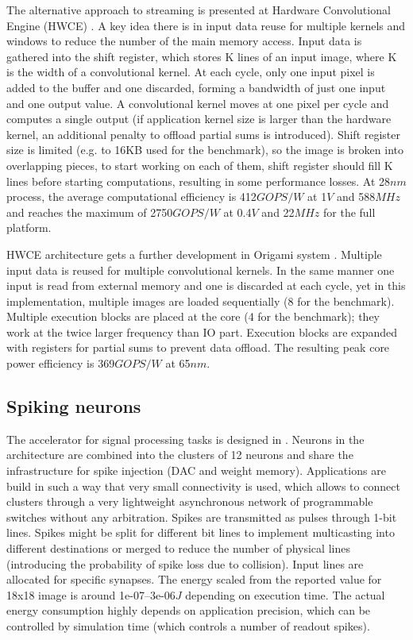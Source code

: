 \documentclass[conference, compsoc]{IEEEtran}
\begin{document}
The alternative approach to streaming is presented at Hardware Convolutional Engine (HWCE) \cite{HWCE}. A key idea there is in input data reuse for multiple kernels and windows to reduce the number of the main memory access. Input data is gathered into the shift register, which stores K lines of an input image, where K is the width of a convolutional kernel. At each cycle, only one input pixel is added to the buffer and one discarded, forming a bandwidth of just one input and one output value. A convolutional kernel moves at one pixel per cycle and computes a single output (if application kernel size is larger than the hardware kernel, an additional penalty to offload partial sums is introduced). Shift register size is limited (e.g. to 16KB used for the benchmark), so the image is broken into overlapping pieces, to start working on each of them, shift register should fill K lines before starting computations, resulting in some performance losses. At 28$ nm $ process, the average computational efficiency is 412$ GOPS/W $ at  1$ V $ and 588$ MHz $ and reaches the maximum of 2750$ GOPS/W $ at 0.4$ V $ and 22$ MHz $ for the full platform.

HWCE architecture gets a further development in Origami system \cite{Origami}. Multiple input data is reused for multiple convolutional kernels. In the same manner one input is read from external memory and one is discarded at each cycle, yet in this implementation, multiple images are loaded sequentially (8 for the benchmark). Multiple execution blocks are placed at the core (4 for the benchmark); they work at the twice larger frequency than IO part. Execution blocks are expanded with registers for partial sums to prevent data offload. The resulting peak core power efficiency is 369$ GOPS/W $ at 65$ nm $.
\subsection{Spiking neurons}
The accelerator for signal processing tasks is designed in \cite{12p}. Neurons in the architecture are combined into the clusters of 12 neurons and share the infrastructure for spike injection (DAC and weight memory). Applications are build in such a way that very small connectivity is used, which allows to connect clusters through a very lightweight asynchronous network of programmable switches without any arbitration. Spikes are transmitted as pulses through 1-bit lines. Spikes might be split for different bit lines to implement multicasting into different destinations or merged to reduce the number of physical lines (introducing the probability of spike loss due to collision). Input lines are allocated for specific synapses. The energy scaled from the reported value for 18x18 image is around 1e-07--3e-06$ J $ depending on execution time. The actual energy consumption highly depends on application precision, which can be controlled by simulation time (which controls a number of readout spikes).
\end{document}
